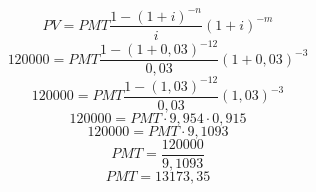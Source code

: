 \documentclass[a4paper, 12pt]{article}
\begin{document}
\begin{itemize}
$$ PV = PMT\frac{1-(1+i)^{-n}}{i}(1+i)^{-m} $$
$$ 120000 = PMT\frac{1-(1+0,03)^{-12}}{0,03}(1+0,03)^{-3} $$
$$ 120000 = PMT\frac{1-(1,03)^{-12}}{0,03}(1,03)^{-3} $$
$$ 120000 = PMT \cdot 9,954 \cdot 0,915 $$
$$ 120000 = PMT \cdot 9,1093 $$
$$ PMT = \frac{120000}{9,1093} $$
$$ \boxed{PMT = 13173,35} $$        



\end{itemize}
\end{document}
